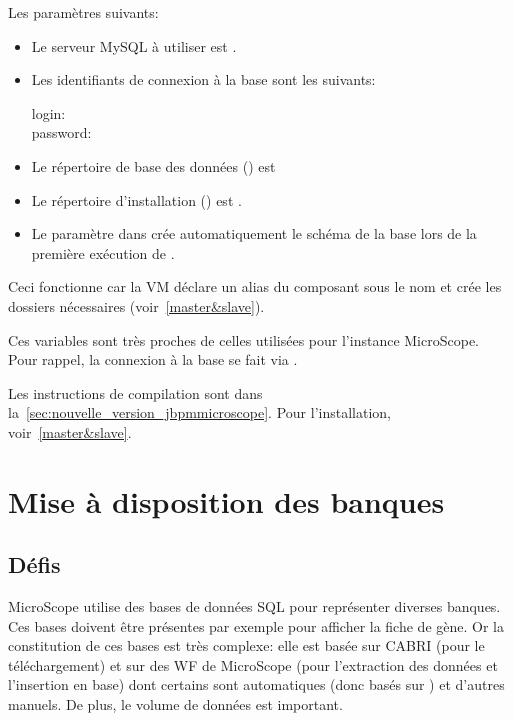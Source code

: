 Les paramètres suivants:
\begin{itemize}
    \item Le serveur MySQL à utiliser est .
    \item Les identifiants de connexion à la base  sont les suivants:
          \begin{description}
              \item[login:] 
              \item[password:] 
          \end{description}
    \item Le répertoire de base des données () est 
    \item Le répertoire d'installation () est .
    \item Le paramètre  dans  crée automatiquement le schéma de la base  lors de la première exécution de .
\end{itemize}\vspace*{\baselineskip}

Ceci fonctionne car la VM  déclare un alias du composant  sous le nom 
et crée les dossiers nécessaires (voir~\autoref{master&slave}).

Ces variables sont très proches de celles utilisées pour l'instance MicroScope.
Pour rappel, la connexion à la base se fait via .

Les instructions de compilation sont dans la~\autoref{sec:nouvelle_version_jbpmmicroscope}.
Pour l'installation, voir~\autoref{master&slave}.

\section{Mise à disposition des banques} \label{sec:acces_banques}

\subsection{Défis}

MicroScope utilise des bases de données SQL pour représenter diverses banques.
Ces bases doivent être présentes par exemple pour afficher la fiche de gène.
Or la constitution de ces bases est très complexe:
elle est basée sur CABRI (pour le téléchargement)
et sur des WF de MicroScope (pour l'extraction des données et l'insertion en base)
dont certains sont automatiques (donc basés sur ) et d'autres manuels.
De plus, le volume de données est important.


